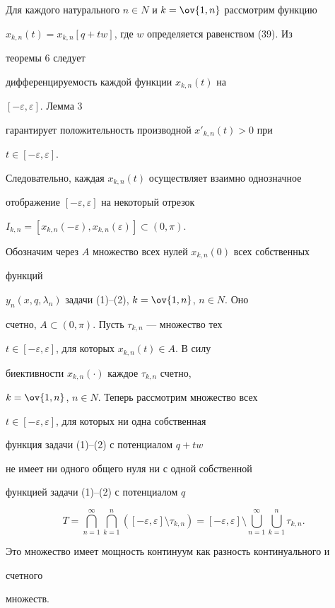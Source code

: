  


\begin{pf} 


Для каждого натурального $n\in N$ и $k=\ov{1,n}$ рассмотрим функцию 


$x_{k,n}(t)=x_{k,n}[q+t w]$, где $w$ определяется равенством (39). Из 


теоремы 6 следует 


дифференцируемость каждой функции $x_{k,n}(t)$ на 


$[-\varepsilon,\varepsilon]$. Лемма 3 


гарантирует положительность производной $x'_{k,n}(t)>0$ при 


$t\in[-\varepsilon,\varepsilon]$. 


Следовательно, каждая $x_{k,n}(t)$ осуществляет взаимно однозначное 


отображение $[-\varepsilon,\varepsilon]$ на некоторый отрезок 


$I_{k,n}=[x_{k,n}(-\varepsilon),x_{k,n}(\varepsilon)]\subset(0,\pi)$. 


 


Обозначим через $A$ множество всех нулей $x_{k,n}(0)$ всех собственных 


функций 


$y_n(x,q,\lambda_n)$ задачи (1)--(2), $k=\ov{1,n}$, $n\in N$. Оно 


счетно, $A\subset(0,\pi)$. Пусть $\tau_{k,n}$ --- множество тех 


$t\in[-\varepsilon,\varepsilon]$, для которых $x_{k,n}(t)\in A$. В силу 


биективности $x_{k,n}(\cdot)$ каждое $\tau_{k,n}$ счетно, 


$k=\ov{1,n}$, $n\in N$. Теперь рассмотрим множество всех 


$t\in[-\varepsilon,\varepsilon]$, для которых ни одна собственная 


функция задачи (1)--(2) с потенциалом $q+t w$ 


не имеет ни одного общего нуля ни с одной собственной 


функцией задачи (1)--(2) с потенциалом $q$ 


$$ 


T=\bigcap^\infty_{n=1}\bigcap^n_{k=1} 


([-\varepsilon,\varepsilon]\setminus\tau_{k,n})= 


[-\varepsilon,\varepsilon]\setminus 


\bigcup^\infty_{n=1}\bigcup^n_{k=1}\tau_{k,n}. 


$$ 


Это множество имеет мощность континуум как разность континуального и 


счетного 


множеств. 


\end{pf} 


